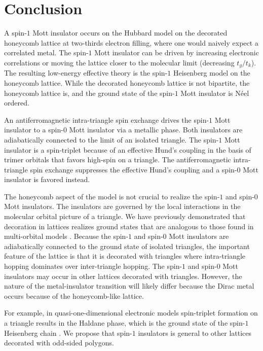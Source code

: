 \documentclass[reprint,aps,prb,amsmath,amssymb]{revtex4-2}
\begin{document}
\section{Conclusion} \label{sec:conclusion}

A spin-$1$ Mott insulator occurs on the Hubbard model on the decorated honeycomb lattice at two-thirds electron filling, where one would naively expect a correlated metal. The spin-$1$ Mott insulator can be driven by increasing electronic correlations or moving the lattice closer to the molecular limit (decreasing $t_g/t_k$). The resulting low-energy effective theory is the spin-$1$ Heisenberg model on the honeycomb lattice. While the decorated honeycomb lattice is not bipartite, the honeycomb lattice is, and the ground state of the spin-$1$ Mott insulator is N\'{e}el ordered.

An antiferromagnetic intra-triangle spin exchange drives the spin-$1$ Mott insulator to a spin-$0$ Mott insulator via a metallic phase. Both insulators are adiabatically connected to the limit of an isolated triangle. The spin-$1$ Mott insulator is a spin-triplet because of an effective Hund's coupling in the basis of trimer orbitals that favors high-spin on a triangle. The antiferromagnetic intra-triangle spin exchange suppresses the effective Hund's coupling and a spin-$0$ Mott insulator is favored instead.

The honeycomb aspect of the model is not crucial to realize the spin-$1$ and spin-$0$ Mott insulators. The insulators are governed by the local interactions in the molecular orbital picture of a triangle. We have previously demonstrated that decoration in lattices realizes ground states that are analogous to those found in multi-orbital models \cite{Nourse2021}. Because the spin-$1$ and spin-$0$ Mott insulators are adiabatically connected to the ground state of isolated triangles, the important feature of the lattice is that it is decorated with triangles where intra-triangle hopping dominates over inter-triangle hopping. The spin-$1$ and spin-$0$ Mott insulators may occur in other lattices decorated with triangles. However, the nature of the metal-insulator transition will likely differ because the Dirac metal occurs because of the honeycomb-like lattice.

For example, in quasi-one-dimensional electronic models spin-triplet formation on a triangle results in the Haldane phase, which is the ground state of the spin-$1$ Heisenberg chain \cite{Janani2014a,Janani2014b,Nourse2016,Reja2019}. We propose that spin-$1$ insulators is general to other lattices decorated with odd-sided polygons.
\end{document}
